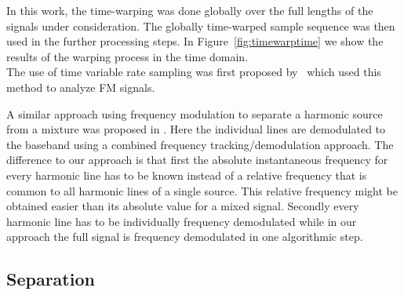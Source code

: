 In this work, the time-warping was done globally over the full lengths of the
signals under consideration. The globally time-warped sample sequence
was then used in the further processing steps. In Figure~\ref{fig:timewarptime} we show the results of the warping process in the time domain. \\

The use of time variable rate sampling was first proposed by~\cite{wulich92} which used this method to analyze FM signals.

A similar approach using frequency modulation to separate a harmonic
source from a mixture was proposed in \cite{wang95}. Here the
individual lines are demodulated to the baseband using a combined frequency
tracking/demodulation approach. The difference to our approach is that first
the absolute instantaneous frequency for every harmonic line has to be known
instead of a relative frequency that is common to all harmonic lines of a single
source. This relative frequency might be obtained easier than its
absolute value for a mixed signal. Secondly every harmonic line has to be individually frequency demodulated while in our approach the full signal is frequency demodulated in one algorithmic step.\\

\subsection{Separation} %
\label{sub:pitch_variation_informed_source_separation}

